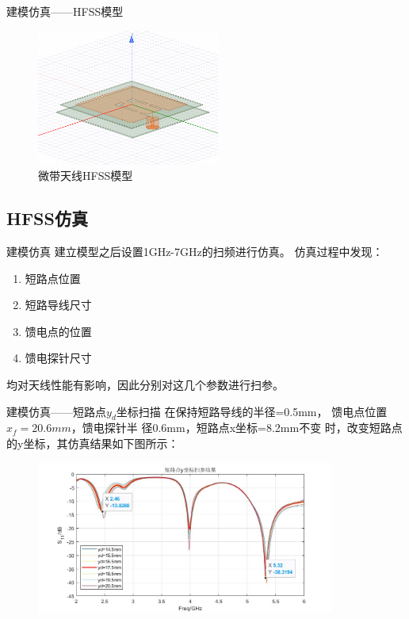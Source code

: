 \documentclass[10pt]{beamer}
\begin{document}
\begin{frame}{建模仿真——{\normalsize HFSS模型}}
	\begin{figure}[htbp]
		\centering
		\includegraphics[width=6cm]{figs/13.png}
		\caption{微带天线HFSS模型}
		\label{f2}
	\end{figure}
\end{frame}
\subsection*{HFSS仿真}
\begin{frame}{建模仿真}
\qquad 建立模型之后设置1GHz-7GHz的扫频进行仿真。
仿真过程中发现：
\begin{enumerate}
	
	\item 短路点位置
	\item 短路导线尺寸
	\item 馈电点的位置 
	\item 馈电探针尺寸
\end{enumerate}
均对天线性能有影响，因此分别对这几个参数进行扫参。
	
\end{frame}

\begin{frame}{建模仿真——{\normalsize 短路点$y_d$坐标扫描}}
	\qquad 在保持短路导线的半径=0.5mm，
	馈电点位置$ x_f=20.6mm $，馈电探针半
	径0.6mm，短路点x坐标=8.2mm不变
	时，改变短路点的y坐标，其仿真结果如下图所示：
	\begin{figure}[htbp]
		\centering
		\includegraphics[height=5cm]{figs/20.jpg}
	\end{figure}	
\end{frame}
\end{document}
